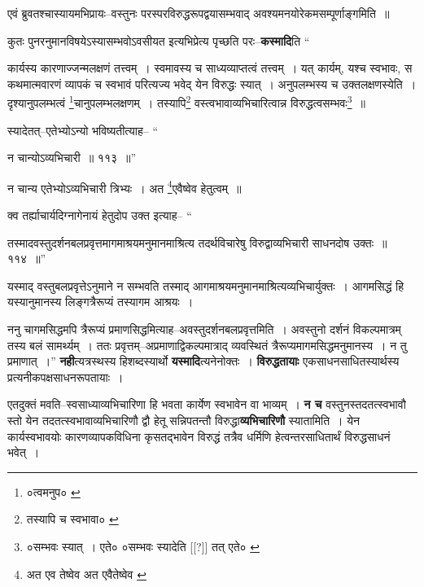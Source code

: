 \documentclass[article,12pt,a4paper]{memoir}
\begin{document}
	  \pstart एवं ब्रुवतश्चास्यायमभिप्रायः--वस्तुनः परस्परविरुद्धरूपद्वयासम्भवाद् अवश्यमनयोरेकमसम्पूर्णाङ्गमिति ॥
	\pend
      

	  \pstart कुतः पुनरनुमानविषयेऽस्यासम्भवोऽवसीयत इत्यभिप्रेत्य पृच्छति परः--\textbf{कस्मादि}ति  \leavevmode{} “
	  
	कार्यस्य कारणाज्जन्मलक्षणं तत्त्वम् । स्वमावस्य च साध्यव्याप्तत्वं तत्त्वम् । यत् कार्यम्, यश्च स्वभावः, स कथमात्मवारणं व्यापकं च स्वभावं परित्यज्य भवेद् येन विरुद्धः स्यात् । अनुपलम्भस्य च उक्तलक्षणस्येति । दृश्यानुपलम्भत्वं \footnote{०त्वमनुप० \cite{dp-msA} \cite{dp-msB} \cite{dp-msC} \cite{dp-edP} \cite{dp-edH} \cite{dp-edE} \cite{dp-edN}}चानुपलम्भलक्षणम् । तस्यापि\footnote{तस्यापि च स्वभावा० \cite{dp-msA} \cite{dp-msB} \cite{dp-edP} \cite{dp-edH}} वस्त्वभावाव्यभिचारित्वान्न विरुद्धत्वसम्भवः\footnote{०सम्भवः स्यात् । एते० \cite{dp-msA} \cite{dp-edP} \cite{dp-edH} ०सम्भवः स्यादेति [[?]] तत् एते० \cite{dp-msB}} ॥ 
	  
	स्यादेतत्--एतेभ्योऽन्यो भविष्यतीत्याह-- “
	  
	न चान्योऽव्यभिचारी ॥ ११३ ॥” 
	  
	न चान्य एतेभ्योऽव्यभिचारी त्रिभ्यः । अत \footnote{अत एव तेष्वेव \cite{dp-msA} \cite{dp-msB} \cite{dp-edP} \cite{dp-edH} \cite{dp-edE} \cite{dp-edN} अत एवैतेष्वेव \cite{dp-msC}}एवैष्वेव हेतुत्वम् ॥ 
	  
	क्व तर्ह्याचार्यदिग्नागेनायं हेतुदोप उक्त इत्याह-- “
	  
	तस्मादवस्तुदर्शनबलप्रवृत्तमागमाश्रयमनुमानमाश्रित्य तदर्थविचारेषु विरुद्वाव्यभिचारी साधनदोष उक्तः ॥ ११४ ॥” 
	  
	यस्माद् वस्तुबलप्रवृत्तेऽनुमाने न सम्भवति तस्माद् आगमाश्रयमनुमानमाश्रित्यव्यभिचार्युक्तः । आगमसिद्धं हि यस्यानुमानस्य लिङ्गत्रैरूप्यं तस्यागम आश्रयः । 
	  
	ननु चागमसिद्धमपि त्रैरूप्यं प्रमाणसिद्धमित्याह--अवस्तुदर्शनबलप्रवृत्तमिति । अवस्तुनो दर्शनं विकल्पमात्रम् तस्य बलं सामर्थ्यम् । ततः प्रवृत्तम्--अप्रमाणाद्विकल्पमात्राद् व्यवस्थितं त्रैरूप्यमागमसिद्धमनुमानस्य । न तु प्रमाणात् ।” \textbf{नही}त्यत्रस्थस्य हिशब्दस्यार्थो \textbf{यस्मादि}त्यनेनोक्तः । \textbf{विरुद्धतायाः} एकसाधनसाधितस्यार्थस्य प्रत्यनीकपक्षसाधनरूपतायाः ।
	\pend
      

	  \pstart एतदुक्तं मवति--स्वसाध्याव्यभिचारिणा हि भवता कार्येण स्वभावेन वा भाव्यम् । \textbf{न च} वस्तुनस्तदतत्स्वभावौ स्तो येन तदतत्स्वभावाव्यभिचारिणौ द्वौ हेतू सन्निपतन्तौ विरुद्धा\textbf{व्यभिचारिणौ} स्यातामिति । येन कार्यस्वभावयोः कारणव्यापकविधिना कृसतद्भावेन विरुद्धं तत्रैव धर्मिणि हेत्वन्तरसाधितार्थं विरुद्धसाधनं भवेत् ।
	\pend
      
\end{document}
